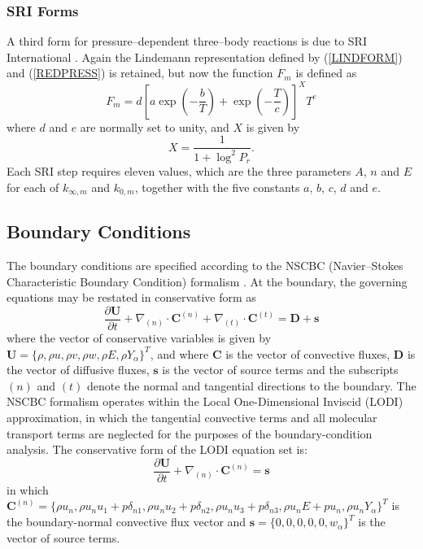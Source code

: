 \documentclass[dvips]{article}
\begin{document}
\subsubsection{SRI Forms}
\label{SRISTEP}
A third form for pressure--dependent three--body reactions is due to SRI
International \cite{Stewartetal}.  Again the Lindemann representation
defined by (\ref{LINDFORM}) and (\ref{REDPRESS}) is retained, but now
the function $F_{m}$ is defined as
\begin{equation}
F_{m} = d\left[
a \exp{\left(-\frac{b}{T}\right)}
+\exp{\left(-\frac{T}{c}\right)}
\right]^{X}T^{e}
\label{SRIFORM}
\end{equation}
where $d$ and $e$ are normally set to unity, and $X$ is given by
\begin{equation}
X = \frac{1}{1+\log^{2} P_{r}}.
\end{equation}
Each SRI step requires eleven values, which are the three parameters $A$, $n$
and $E$ for each of $k_{\infty,m}$ and $k_{0,m}$, together with the five
constants $a$, $b$, $c$, $d$ and $e$.

\subsection{Boundary Conditions }
The boundary conditions are specified according to the NSCBC
(Navier--Stokes Characteristic Boundary Condition) formalism
\cite{PoinsotLele, SutherlandKennedy}.  At the boundary, the governing
equations may be restated in conservative form as \cite{SutherlandKennedy}
\begin{equation}
\frac{\partial {\mathbf U}}{\partial t}
+ \nabla_{(n)}\cdot {\mathbf C}^{(n)}
+ \nabla_{(t)}\cdot {\mathbf C}^{(t)}
= {\mathbf D} + {\mathbf s}
\label{GovEqConserv}
\end{equation}
where the vector of conservative variables is given by
${\mathbf U} = \{\rho, \rho u, \rho v, \rho w, \rho E, \rho
Y_{\alpha}\}^{T}$, and where
${\mathbf C}$ is the vector of convective fluxes, ${\mathbf D}$ is
the vector of diffusive fluxes, ${\mathbf s}$ is the vector of source
terms and the subscripts $(n)$ and $(t)$ denote the normal and tangential
directions to the boundary.  The NSCBC formalism operates within the Local
One-Dimensional Inviscid (LODI) approximation, in which the tangential
convective terms and all molecular transport terms are neglected for the
purposes of the boundary-condition analysis.  The conservative form of the LODI equation set is:
\begin{equation}
\frac{\partial {\mathbf U}}{\partial t}
+ \nabla_{(n)}\cdot {\mathbf C}^{(n)}
= {\mathbf s}
\label{GovEqConservLODI}
\end{equation}
in which
${\mathbf C}^{(n)} = \{\rho u_{n},
\rho u_{n} u_{1} + p\delta_{n1},
\rho u_{n} u_{2} + p\delta_{n2},
\rho u_{n} u_{3} + p\delta_{n3},
\rho u_{n} E + p u_{n},
\rho u_{n} Y_{\alpha}\}^{T}$ is the boundary-normal convective flux
vector and ${\mathbf s} = \{0,0,0,0,0,w_{\alpha}\}^{T}$ is the 
vector of source terms. 
\end{document}
